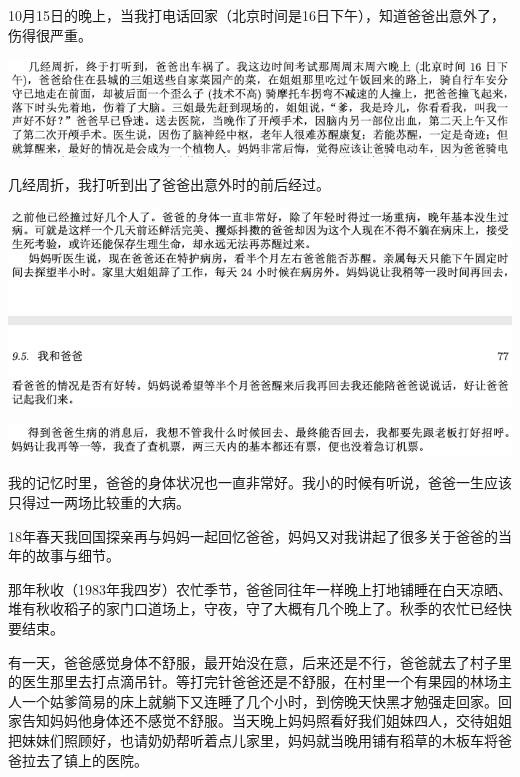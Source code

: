 \documentclass[9pt, b5paper]{article}
\begin{document}
10月15日的晚上，当我打电话回家（北京时间是16日下午），知道爸爸出意外了，伤得很严重。

\begin{center}
\includegraphics[width=.9\linewidth]{./pic/backups_plans_20210414_193202.png}
\end{center}

几经周折，我打听到出了爸爸出意外时的前后经过。

\begin{center}
\includegraphics[width=.9\linewidth]{./pic/backups_plans_20210416_154642.png}
\end{center}

\begin{center}
\includegraphics[width=.9\linewidth]{./pic/backups_plans_20210416_160907.png}
\end{center}

我的记忆时里，爸爸的身体状况也一直非常好。我小的时候有听说，爸爸一生应该只得过一两场比较重的大病。

18年春天我回国探亲再与妈妈一起回忆爸爸，妈妈又对我讲起了很多关于爸爸的当年的故事与细节。 

那年秋收（1983年我四岁）农忙季节，爸爸同往年一样晚上打地铺睡在白天凉晒、堆有秋收稻子的家门口道场上，守夜，守了大概有几个晚上了。秋季的农忙已经快要结束。

有一天，爸爸感觉身体不舒服，最开始没在意，后来还是不行，爸爸就去了村子里的医生那里去打点滴吊针。等打完针爸爸还是不舒服，在村里一个有果园的林场主人一个姑爹简易的床上就躺下又连睡了几个小时，到傍晚天快黑才勉强走回家。回家告知妈妈他身体还不感觉不舒服。当天晚上妈妈照看好我们姐妹四人，交待姐姐把妹妹们照顾好，也请奶奶帮听着点儿家里，妈妈就当晚用铺有稻草的木板车将爸爸拉去了镇上的医院。
\end{document}
